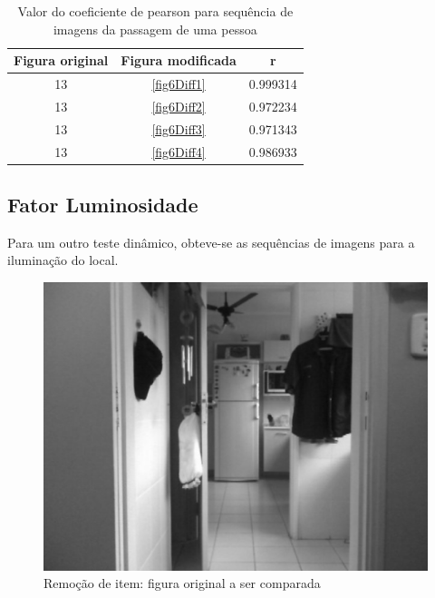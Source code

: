 \documentclass[10pt,a4paper]{article}
\begin{document}
\begin{table}[h!]
  \begin{center}
    \caption{Valor do coeficiente de pearson para sequência de imagens
      da passagem de uma pessoa}
    \begin{tabular}{|c|c|c|}
      \hline
      Figura original & Figura modificada & r\\
      \hline
      13 &  \ref{fig6Diff1} & 0.999314\\
      13 &  \ref{fig6Diff2} & 0.972234\\
      13 &  \ref{fig6Diff3} & 0.971343\\
      13 &  \ref{fig6Diff4} & 0.986933\\
      \hline
    \end{tabular}
  \end{center}
\end{table}


\newpage
\subsection{Fator Luminosidade}
Para um outro teste dinâmico, obteve-se as sequências de imagens para
a iluminação do local.

\begin{figure}[h!]
\begin{center}
\includegraphics[scale=0.35]{photos/luzes/gBase}
\caption{Remoção de item: figura original a ser comparada}
\end{center}
\label{luzes}
\end{figure}
\end{document}
